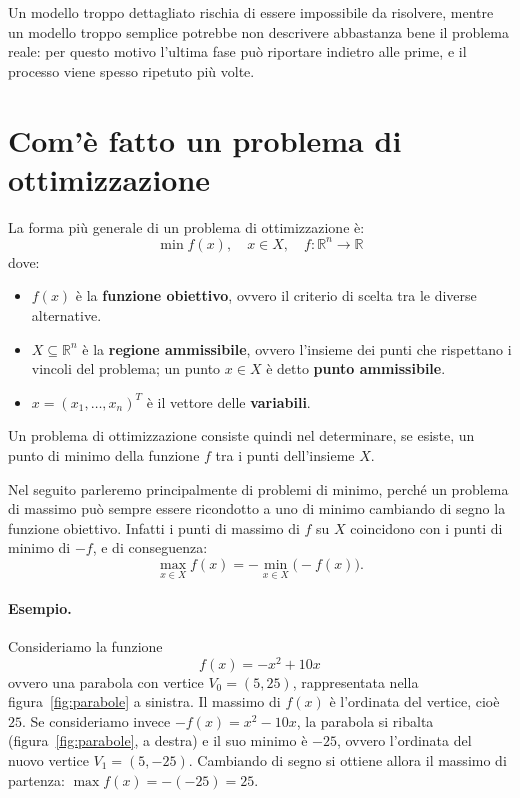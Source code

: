 Un modello troppo dettagliato rischia di essere impossibile da risolvere, mentre un modello troppo semplice potrebbe non descrivere abbastanza bene il problema reale: per questo motivo l'ultima fase può riportare indietro alle prime, e il processo viene spesso ripetuto più volte.

\section{Com'è fatto un problema di ottimizzazione}
La forma più generale di un problema di ottimizzazione è:
\begin{equation}\label{eq:opt-generale}
\min f(x), \quad x \in X, \quad f: \mathbb{R}^n \to \mathbb{R}
\end{equation}
dove:
\begin{itemize}
    \item $f(x)$ è la \textbf{funzione obiettivo}, ovvero il criterio di scelta tra le diverse alternative.
    \item $X \subseteq \mathbb{R}^n$ è la \textbf{regione ammissibile}, ovvero l'insieme dei punti che rispettano i vincoli del problema; un punto $x \in X$ è detto \textbf{punto ammissibile}.
    \item $x = (x_1, \dots, x_n)^T$ è il vettore delle \textbf{variabili}.
\end{itemize}

Un problema di ottimizzazione consiste quindi nel determinare, se esiste, un punto di minimo della funzione $f$ tra i punti dell'insieme $X$.

\begin{osservazione}
Nel seguito parleremo principalmente di problemi di minimo, perché un problema di massimo può sempre essere ricondotto a uno di minimo cambiando di segno la funzione obiettivo. Infatti i punti di massimo di $f$ su $X$ coincidono con i punti di minimo di $-f$, e di conseguenza:
\[
\max_{x \in X} f(x) = -\min_{x \in X} \big(-f(x)\big).
\]
\end{osservazione}

\paragraph{Esempio.}
Consideriamo la funzione
\[
f(x) = -x^2 + 10x
\]
ovvero una parabola con vertice $V_0 = (5, 25)$, rappresentata nella figura~\ref{fig:parabole} a sinistra. Il massimo di $f(x)$ è l'ordinata del vertice, cioè $25$. Se consideriamo invece $-f(x) = x^2 - 10x$, la parabola si ribalta (figura~\ref{fig:parabole}, a destra) e il suo minimo è $-25$, ovvero l'ordinata del nuovo vertice $V_1 = (5, -25)$. Cambiando di segno si ottiene allora il massimo di partenza: $\max f(x) = -(-25) = 25$.

